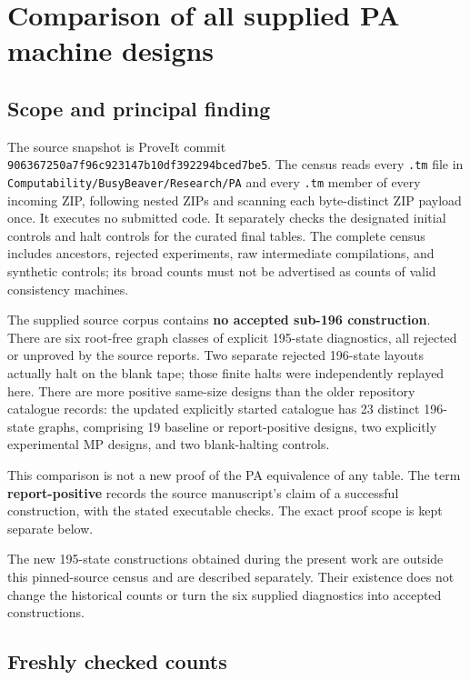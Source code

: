 \section{Comparison of all supplied PA machine designs}

\subsection{Scope and principal finding}

The source snapshot is ProveIt commit \nolinkurl{906367250a7f96c923147b10df392294bced7be5}.
The census reads every \nolinkurl{.tm} file in \nolinkurl{Computability/BusyBeaver/Research/PA}
and every \nolinkurl{.tm} member of every incoming ZIP, following nested ZIPs and
scanning each byte-distinct ZIP payload once. It executes no submitted code.
It separately checks the designated initial controls and halt controls for
the curated final tables. The complete census includes ancestors, rejected
experiments, raw intermediate compilations, and synthetic controls; its broad
counts must not be advertised as counts of valid consistency machines.

The supplied source corpus contains \textbf{no accepted sub-196 construction}.
There are six root-free graph classes of explicit 195-state diagnostics,
all rejected or unproved by the source reports. Two separate rejected
196-state layouts actually halt on the blank tape; those finite halts were
independently replayed here. There are more positive same-size designs than
the older repository catalogue records: the updated explicitly started
catalogue has 23 distinct 196-state graphs, comprising 19 baseline or
report-positive designs, two explicitly experimental MP designs, and two
blank-halting controls.

This comparison is not a new proof of the PA equivalence of any table.
The term \textbf{report-positive} records the source manuscript's claim of a
successful construction, with the stated executable checks. The exact proof
scope is kept separate below.

The new 195-state constructions obtained during the present work are outside
this pinned-source census and are described separately. Their existence does
not change the historical counts or turn the six supplied diagnostics into
accepted constructions.

\subsection{Freshly checked counts}

